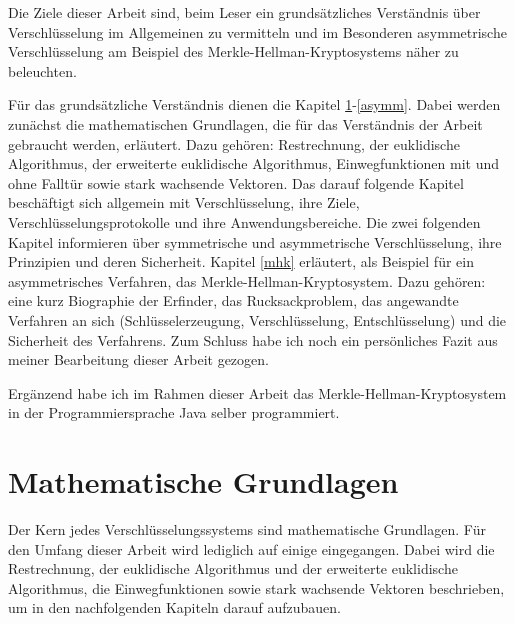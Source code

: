 \documentclass[a4paper,12pt,titlepage]{article}
\begin{document}
Die Ziele dieser Arbeit sind, beim Leser ein grundsätzliches Verständnis über
Verschlüsselung im Allgemeinen zu vermitteln und im Besonderen asymmetrische
Verschlüsselung am Beispiel des Merkle-Hellman-Kryptosystems näher zu
beleuchten.

Für das grundsätzliche Verständnis dienen die Kapitel \ref{math}-\ref{asymm}.
Dabei werden zunächst die mathematischen Grundlagen, die für das Verständnis
der Arbeit gebraucht werden, erläutert. Dazu gehören: Restrechnung, der
euklidische Algorithmus, der erweiterte euklidische Algorithmus,
Einwegfunktionen mit und ohne Falltür sowie stark wachsende Vektoren. Das
darauf folgende Kapitel beschäftigt sich allgemein mit Verschlüsselung, ihre
Ziele, Verschlüsselungsprotokolle und ihre Anwendungsbereiche. Die zwei
folgenden Kapitel informieren über symmetrische und asymmetrische
Verschlüsselung, ihre Prinzipien und deren Sicherheit. Kapitel \ref{mhk}
erläutert, als Beispiel für ein asymmetrisches Verfahren, das
Merkle-Hellman-Kryptosystem. Dazu gehören: eine kurz Biographie der Erfinder,
das Rucksackproblem, das angewandte Verfahren an sich (Schlüsselerzeugung,
Verschlüsselung, Entschlüsselung) und die Sicherheit des Verfahrens. Zum
Schluss habe ich noch ein persönliches Fazit aus meiner Bearbeitung dieser
Arbeit gezogen.

Ergänzend habe ich im Rahmen dieser Arbeit
das Merkle-Hellman-Kryptosystem in der Programmiersprache Java selber
programmiert.

\newpage

\section{Mathematische Grundlagen}\label{math}

Der Kern jedes Verschlüsselungssystems sind mathematische Grundlagen. Für den Umfang dieser Arbeit wird lediglich auf einige eingegangen. Dabei wird die Restrechnung, der euklidische Algorithmus und der erweiterte euklidische Algorithmus, die Einwegfunktionen sowie stark wachsende Vektoren beschrieben, um in den nachfolgenden Kapiteln darauf aufzubauen.
\end{document}
